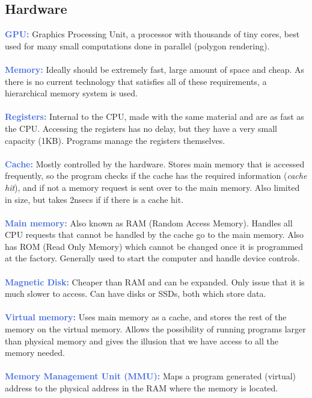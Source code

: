 \documentclass[a4paper,10pt]{article}
\begin{document}
\subsection{Hardware}
\textcolor{RoyalBlue}{\textbf{GPU:}} Graphics Processing Unit, a processor with thousands of tiny cores, best used for many small computations done in parallel (polygon rendering). \\\\
\textcolor{RoyalBlue}{\textbf{Memory:}} Ideally should be extremely fast, large amount of space and cheap. As there is no current technology that satisfies all of these requirements, a hierarchical memory system is used. \\\\ 
\textcolor{RoyalBlue}{\textbf{Registers:}} Internal to the CPU, made with the same material and are as fast as the CPU. Accessing the registers has no delay, but they have a very small capacity (1KB). Programs manage the registers themselves. \\\\
\textcolor{RoyalBlue}{\textbf{Cache:}} Mostly controlled by the hardware. Stores main memory that is accessed frequently, so the program checks if the cache has the required information (\emph{cache hit}), and if not a memory request is sent over to the main memory. Also limited in size, but takes 2nsecs if if there is a cache hit. \\\\
\textcolor{RoyalBlue}{\textbf{Main memory:}} Also known as RAM (Random Access Memory). Handles all CPU requests that cannot be handled by the cache go to the main memory. Also has ROM (Read Only Memory) which cannot be changed once it is programmed at the factory. Generally used to start the computer and handle device controls.\\\\
\textcolor{RoyalBlue}{\textbf{Magnetic Disk:}} Cheaper than RAM and can be expanded. Only issue that it is much slower to access. Can have disks or SSDs, both which store data. \\\\
\textcolor{RoyalBlue}{\textbf{Virtual memory:}} Uses main memory as a cache, and stores the rest of the memory on the virtual memory. Allows the possibility of running programs larger than physical memory and gives the illusion that we have access to all the memory needed. \\\\
\textcolor{RoyalBlue}{\textbf{Memory Management Unit (MMU):}} Maps a program generated (virtual) address to the physical address in the RAM where the memory is located. \\\\
\end{document}
